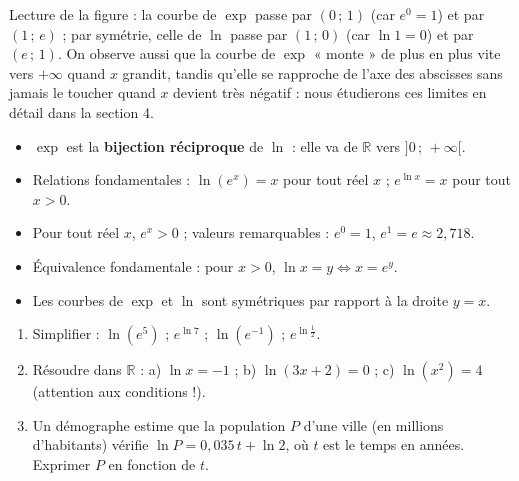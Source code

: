 \documentclass[11pt]{article}
\begin{document}
Lecture de la figure : la courbe de $\exp$ passe par $(0\,;\,1)$ (car $e^0 = 1$) et par $(1\,;\,e)$ ; par symétrie, celle de $\ln$ passe par $(1\,;\,0)$ (car $\ln 1 = 0$) et par $(e\,;\,1)$. On observe aussi que la courbe de $\exp$ « monte » de plus en plus vite vers $+\infty$ quand $x$ grandit, tandis qu'elle se rapproche de l'axe des abscisses sans jamais le toucher quand $x$ devient très négatif : nous étudierons ces limites en détail dans la section 4.

\begin{aretenir}
\begin{itemize}
\item $\exp$ est la \textbf{bijection réciproque} de $\ln$ : elle va de $\mathbb{R}$ vers $]0\,;\,+\infty[$.
\item Relations fondamentales : $\ln(e^x) = x$ pour tout réel $x$ ; $e^{\ln x} = x$ pour tout $x > 0$.
\item Pour tout réel $x$, $e^x > 0$ ; valeurs remarquables : $e^0 = 1$, $e^1 = e \approx 2,718$.
\item Équivalence fondamentale : pour $x > 0$, $\ln x = y \iff x = e^y$.
\item Les courbes de $\exp$ et $\ln$ sont symétriques par rapport à la droite $y = x$.
\end{itemize}
\end{aretenir}

\begin{exercice}
\begin{enumerate}
\item Simplifier : $\ln\left(e^{5}\right)$ ; $e^{\ln 7}$ ; $\ln\left(e^{-1}\right)$ ; $e^{\ln \frac{1}{2}}$.
\item Résoudre dans $\mathbb{R}$ : a) $\ln x = -1$ ; b) $\ln(3x + 2) = 0$ ; c) $\ln(x^2) = 4$ (attention aux conditions !).
\item Un démographe estime que la population $P$ d'une ville (en millions d'habitants) vérifie $\ln P = 0,035\,t + \ln 2$, où $t$ est le temps en années. Exprimer $P$ en fonction de $t$.
\end{enumerate}
\end{exercice}
\end{document}
